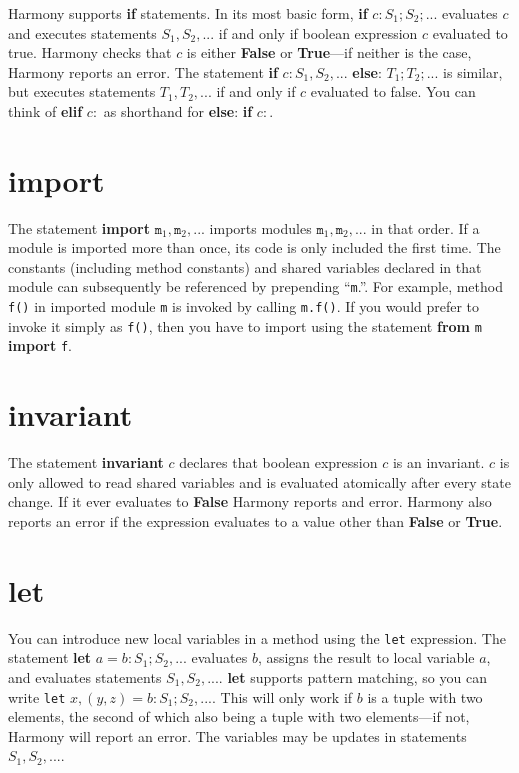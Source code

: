 \documentclass{report}
\begin{document}
Harmony supports \textbf{if} statements.
In its most basic form, \textbf{if} $c: S_1; S_2; ...$ evaluates $c$
and executes statements $S_1, S_2, ...$ if and only if boolean expression
$c$ evaluated to true.
Harmony checks that $c$ is either \textbf{False} or \textbf{True}---if neither
is the case, Harmony reports an error.
The statement \textbf{if} $c: S_1, S_2, ...$ \textbf{else}:
$T_1; T_2; ...$ is similar, but executes statements $T_1, T_2, ...$
if and only if $c$ evaluated to false.
You can think of \textbf{elif} $c:$ as shorthand for
\textbf{else}: \textbf{if} $c:$.

\section{\textbf{import}}

The statement \textbf{import} $\mathtt{m}_1, \mathtt{m}_2, ...$ imports modules
$\mathtt{m}_1, \mathtt{m}_2, ...$ in that order.
If a module is imported more than once,
its code is only included the first time.
The constants (including method constants) and shared variables declared 
in that module can subsequently be referenced by prepending ``\texttt{m}.''.
For example, method \texttt{f()} in imported module \texttt{m} is invoked
by calling \texttt{m.f()}.  If you would prefer to invoke it simply as
\texttt{f()}, then you have to import using the statement
\textbf{from} \texttt{m} \textbf{import} \texttt{f}.

\section{\textbf{invariant}}

The statement \textbf{invariant} $c$ declares that boolean expression $c$
is an invariant.  $c$ is only allowed to read shared variables and
is evaluated atomically after every state change.
If it ever evaluates to \textbf{False} Harmony reports and error.  Harmony
also reports an error if the expression evaluates to a value other
than \textbf{False} or \textbf{True}.

\section{\textbf{let}}

You can introduce new local variables in a method using the
\texttt{let} expression.
The statement \textbf{let} $a = b: S_1; S_2, ...$ evaluates $b$, assigns
the result to local variable $a$, and evaluates statements
$S_1, S_2, ...$.  \textbf{let} supports pattern matching, so you can
write \texttt{let} $x, (y, z) = b: S_1; S_2, ...$.  This will only work
if $b$ is a tuple with two elements, the second of which also being a
tuple with two elements---if not, Harmony will report an error.
The variables may be updates in statements $S_1, S_2, ...$.
\end{document}
